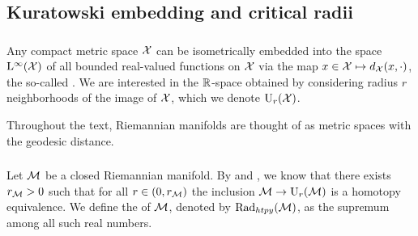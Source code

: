 

\subsection{Kuratowski embedding and critical radii}\label{sub:filling radii}

\subsubsection{}

Any compact metric space $\mathcal{X}$ can be isometrically embedded into the space $\mathrm{L}^\infty(\mathcal{X})$ of all bounded real-valued functions on $\mathcal{X}$ via the map $x \in \mathcal{X} \mapsto d_{\mathcal{X}}(x,\cdot)$, the so-called .
We are interested in the \(\mathbb{R}\)-space obtained by considering radius \(r\) neighborhoods of the image of \(\mathcal{X}\), which we denote \(\mathrm{U}_r(\mathcal{X})\).

Throughout the text, Riemannian manifolds are thought of as metric spaces with the geodesic distance.

\subsubsection{}\label{ss:first_critical_value}

Let \(\mathcal{M}\) be a closed Riemannian manifold.
By \cite[Thm.~3.5]{hausmann1995vietoris} and \cite[Thm.~4.1]{lim2024vietoris}, we know that there exists \(r_{\mathcal{M}} > 0\) such that for all \(r \in (0,r_{\mathcal{M}})\) the inclusion \(\mathcal{M} \to \mathrm{U}_r(\mathcal{M})\) is a homotopy equivalence.
We define the  of \(\mathcal{M}\), denoted by \(\mathrm{Rad}_{htpy}(\mathcal{M})\), as the supremum among all such real numbers.



\subsubsection{}

